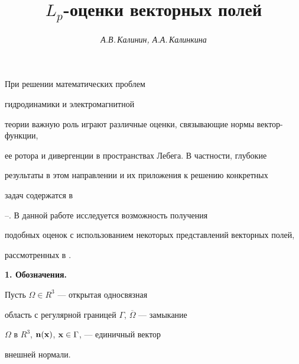 \author{\it А.В.\,Калинин, А.А.\,Калинкина}




\title{$L_p$-оценки векторных полей}





\date{}




\pagestyle{plain} %







\maketitle


\label{begin}








При решении математических проблем


гидродинамики и электромагнитной


теории важную роль играют различные оценки, связывающие нормы вектор-функции,


ее ротора и дивергенции в пространствах Лебега. В частности, глубокие


результаты в этом направлении и их приложения к решению конкретных


задач содержатся в 


\cite{1}--\cite{9}. В данной работе исследуется возможность получения


подобных оценок с использованием  некоторых представлений векторных полей,


рассмотренных в \cite{10}.


\addtocounter{section}{1}


\medskip





{\bf 1. Обозначения.}


Пусть $\Omega\in R^3$ --- открытая односвязная


область с регулярной границей $\Gamma$, $\overline{\Omega}$ --- замыкание


$\Omega$ в $R^3$, $\bold n(\bold x)$, $\bold x\in\Gamma$, --- единичный вектор


внешней нормали.



